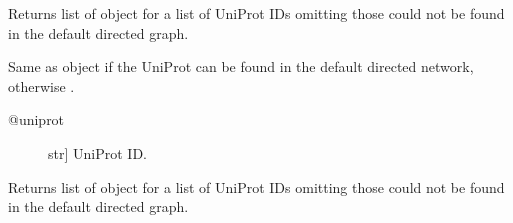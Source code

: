 \documentclass[letterpaper,10pt,english]{sphinxmanual}
\begin{document}
\begin{fulllineitems}
\begin{fulllineitems}
\end{fulllineitems}


\begin{fulllineitems}
\label{\detokenize{reference:pypath.main.PyPath.duniprots}}
Returns list of  object
for a list of UniProt IDs omitting those
could not be found in the default
directed graph.

\end{fulllineitems}


\begin{fulllineitems}
\label{\detokenize{reference:pypath.main.PyPath.dup}}
Same as  object if the UniProt
can be found in the default directed network,
otherwise .
\begin{description}
\item[{@uniprot}] \leavevmode{[}str{]}
UniProt ID.

\end{description}

\end{fulllineitems}


\begin{fulllineitems}
\label{\detokenize{reference:pypath.main.PyPath.dups}}
Returns list of  object
for a list of UniProt IDs omitting those
could not be found in the default
directed graph.

\end{fulllineitems}



\end{fulllineitems}
\end{document}
